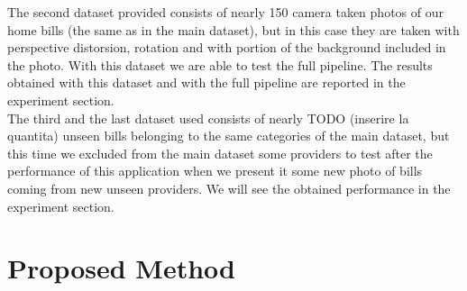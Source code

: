 \documentclass[10pt,twocolumn,letterpaper]{article}
\begin{document}
The second dataset provided consists of nearly 150 camera taken photos of our home bills (the same as in the main dataset), but in this case they are taken with perspective distorsion, rotation and with portion of the background included in the photo. With this dataset we are able to test the full pipeline. The results obtained with this dataset and with the full pipeline are reported in the experiment section. \\

The third and the last dataset used consists of nearly TODO (inserire la quantita) unseen bills belonging to the same categories of the main dataset, but this time we excluded from the main dataset some providers to test after the performance of this application when we present it some new photo of bills coming from new unseen providers. We will see the obtained performance in the experiment section.

\section{Proposed Method}
\end{document}
